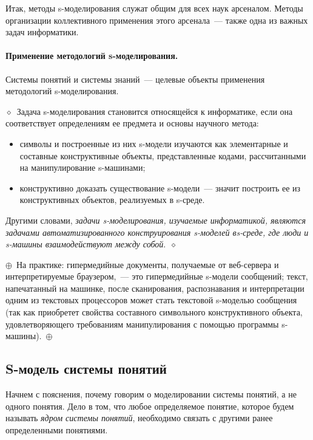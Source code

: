 \begin{multicols}{2}
Итак, методы s-моделирования служат общим для всех наук арсеналом. Методы 
организации коллективного применения этого арсенала~--- также одна из важных 
задач информатики.

\paragraph*{Применение методологий s-моделирования.}Системы
понятий и системы знаний~--- целевые объекты применения методологий
s-моделирования.

\noindent
$\diamond$~Задача s-моделирования становится относящейся к информатике,
если она соответствует определениям ее предмета и основы научного метода:
\begin{itemize}
\item символы и построенные из них s-модели изучаются как элементарные и
составные конструктивные объекты, представленные кодами, рассчитанными
на манипулирование s-машинами;
\item конструктивно доказать существование s-мо\-де\-ли~--- значит построить ее
из конструктивных объектов, реализуемых в s-среде.
\end{itemize}

Другими словами, \textit{задачи s-мо\-де\-ли\-ро\-ва\-ния, изуча\-е\-мые 
информатикой, являются задачами автоматизированного конструирования 
s-мо\-де\-лей в\linebreak s-сре\-де, где люди и s-ма\-ши\-ны взаимодействуют 
между собой}.~$\diamond$

\noindent $\oplus$~На практике: гипермедийные документы, получаемые от 
веб-сер\-ве\-ра и интерпретируемые браузером,~--- это гипермедийные 
s-мо\-де\-ли сообщений; текст, напечатанный на машинке, после сканирования, 
распознавания и интерпретации одним из текстовых процессоров может стать 
текстовой\linebreak 
s-мо\-делью сообщения (так как приобретет свойства 
составного символьного конструктивного объекта, удовлетворяющего требованиям 
манипулирования с помощью программы s-ма\-ши\-ны).~$\oplus$

\subsection{S-модель системы понятий} %

Начнем с пояснения, почему говорим о моделировании системы понятий, а
не одного понятия. Дело в том, что любое определяемое понятие, которое
будем называть \textit{ядром системы понятий}, необходимо связать с другими
ранее определенными понятиями.


\end{multicols}
